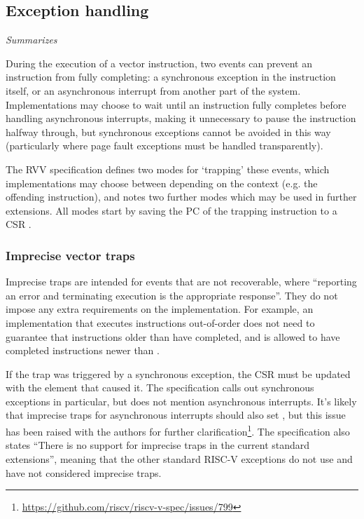 \clearpage

\pagebreak
\subsection{Exception handling}\label{chap:bg:subsec:vexceptions}
\emph{Summarizes \cite[Section 17]{specification-RVV-v1.0}}

During the execution of a vector instruction, two events can prevent an instruction from fully completing: a synchronous exception in the instruction itself, or an asynchronous interrupt from another part of the system.
Implementations may choose to wait until an instruction fully completes before handling asynchronous interrupts, making it unnecessary to pause the instruction halfway through, but synchronous exceptions cannot be avoided in this way (particularly where page fault exceptions must be handled transparently).

The RVV specification defines two modes for `trapping' these events, which implementations may choose between depending on the context (e.g. the offending instruction), and notes two further modes which may be used in further extensions.
All modes start by saving the PC of the trapping instruction to a CSR .

\subsubsection{Imprecise vector traps}
Imprecise traps are intended for events that are not recoverable, where \enquote{reporting an error and terminating execution is the appropriate response}.
They do not impose any extra requirements on the implementation.
For example, an implementation that executes instructions out-of-order does not need to guarantee that instructions older than  have completed, and is allowed to have completed instructions newer than .

If the trap was triggered by a synchronous exception, the  CSR must be updated with the element that caused it.
The specification calls out synchronous exceptions in particular, but does not mention asynchronous interrupts.
It's likely that imprecise traps for asynchronous interrupts should also set , but this issue has been raised with the authors for further clarification\footnote{\url{https://github.com/riscv/riscv-v-spec/issues/799}}.
The specification also states \enquote{There is no support for imprecise traps in the current standard extensions}, meaning that the other standard RISC-V exceptions do not use and have not considered imprecise traps.

